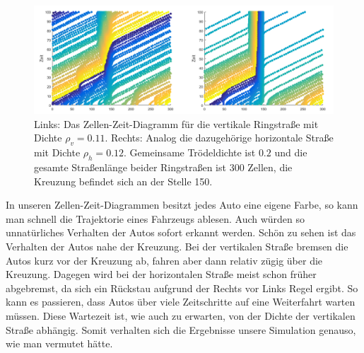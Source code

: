 \begin{figure}%
\centering
\includegraphics[width=15cm]{4_ZelleZeit.png}%
\caption{Links: Das Zellen-Zeit-Diagramm für die vertikale Ringstraße mit Dichte $\rho_v = 0.11$. Rechts: Analog die dazugehörige horizontale Straße mit Dichte $\rho_h=0.12$. Gemeinsame Trödeldichte ist $0.2$ und die gesamte Straßenlänge beider Ringstraßen ist $300$ Zellen, die Kreuzung befindet sich an der Stelle 150.  }%
\label{pic:ZelleZeit}%
\end{figure}

In unseren Zellen-Zeit-Diagrammen besitzt jedes Auto eine eigene Farbe, so kann man schnell die Trajektorie eines Fahrzeugs ablesen. Auch würden so unnatürliches Verhalten der Autos sofort erkannt werden. Schön zu sehen ist das Verhalten der Autos nahe der Kreuzung. Bei der vertikalen Straße bremsen die Autos kurz vor der Kreuzung ab, fahren aber dann relativ zügig über die Kreuzung. Dagegen wird bei der horizontalen Straße meist schon früher abgebremst, da sich ein Rückstau aufgrund der Rechts vor Links Regel ergibt. So kann es passieren, dass Autos über viele Zeitschritte auf eine Weiterfahrt warten müssen. Diese Wartezeit ist, wie auch zu erwarten, von der Dichte der vertikalen Straße abhängig. Somit verhalten sich die Ergebnisse unsere Simulation genauso, wie man vermutet hätte.